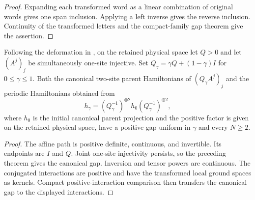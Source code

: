 \begin{proof}
    \leanok
    Expanding each transformed word as a linear combination of original
    words gives one span inclusion. Applying a left inverse gives the
    reverse inclusion. Continuity of the transformed letters and the
    compact-family gap theorem give the assertion.
\end{proof}

\begin{lemma}
    \label{thm:positive_affine_physical_deformation_gap}
    \leanok
    Following the deformation in
    \cite[lines~589--594 and~610--625, Appendix~A]{Schuch2011Phases}, on the
    retained physical space let $Q>0$ and let $(A^j)_j$ be simultaneously
    one-site injective. Set
    $Q_\gamma=\gamma Q+(1-\gamma)I$ for $0\leq\gamma\leq1$.
    Both the canonical two-site parent Hamiltonians of $(Q_\gamma A^j)_j$
    and the periodic Hamiltonians obtained from
    \[
        h_\gamma=(Q_\gamma^{-1})^{\otimes2}
        h_0 (Q_\gamma^{-1})^{\otimes2},
    \]
    where $h_0$ is the initial canonical parent projection and the positive
    factor is given on the retained physical space, have a positive gap
    uniform in $\gamma$ and every $N\geq2$.
\end{lemma}

\begin{proof}
    \leanok
    The affine path is positive definite, continuous, and invertible.
    Its endpoints are $I$ and $Q$. Joint one-site injectivity persists,
    so the preceding theorem gives the canonical gap. Inversion and
    tensor powers are continuous. The conjugated interactions are
    positive and have the transformed local ground spaces as
    kernels. Compact positive-interaction comparison then transfers
    the canonical gap to the displayed interactions.
\end{proof}

